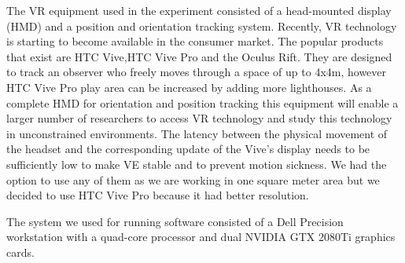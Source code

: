 The VR equipment used in the experiment consisted of a head-mounted display (HMD) and a position and orientation tracking system. Recently, VR technology is starting to become available in the consumer market. The popular products that exist are HTC Vive,HTC Vive Pro and the Oculus Rift. They are designed to track an observer who freely moves through a space of up to 4x4m, however HTC Vive Pro play area can be increased by adding more lighthouses. As a complete HMD for orientation and position tracking this equipment will enable a larger number of researchers to access VR technology and study this technology in unconstrained environments. The latency between the physical movement of the headset and the corresponding update of the Vive’s display needs to be sufficiently low to make VE stable and to prevent motion sickness. We had the option to use any of them as we are working in one square meter area but we decided to use HTC Vive Pro because it had better resolution. \par
The system we used for running software consisted of a Dell Precision workstation with a quad-core processor and dual NVIDIA GTX 2080Ti graphics cards. 
 
